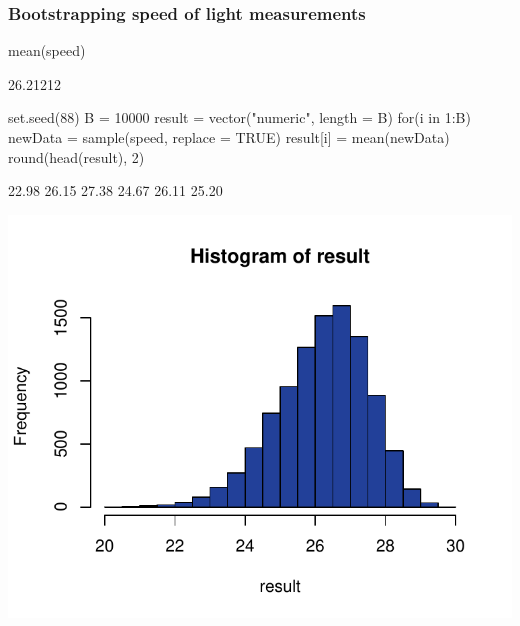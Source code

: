 \documentclass[a4paper]{article}
\begin{document}
\subsubsection{Bootstrapping speed of light measurements}
\begin{Schunk}
\begin{Sinput}
mean(speed)
\end{Sinput}
\begin{Soutput}
[1] 26.21212
\end{Soutput}
\begin{Sinput}
set.seed(88)
B = 10000
result = vector("numeric", length = B)
for(i in 1:B){
  newData = sample(speed, replace = TRUE)
  result[i] = mean(newData)
}
round(head(result), 2)
\end{Sinput}
\begin{Soutput}
[1] 22.98 26.15 27.38 24.67 26.11 25.20
\end{Soutput}


{\centering \includegraphics[width=\maxwidth]{figure/listings-unnamed-chunk-166-1} 

}

\end{Schunk}
\end{document}
